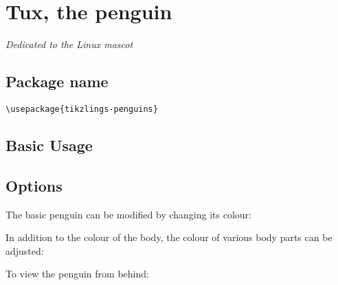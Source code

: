 \documentclass[parskip=half]{scrartcl}
\begin{document}
\section[Penguin]{Tux, the penguin}

\emph{Dedicated to the Linux mascot}

\subsection{Package name}

\begin{tcolorbox}[lower separated=false, lefthand width=.8\linewidth]
\vspace*{0.5cm}
\lstinline|\usepackage{tikzlings-penguins}| 
\vspace*{0.5cm}
\end{tcolorbox}

\subsection{Basic Usage}

\begin{tcblisting}{}
\penguin
\end{tcblisting}

\subsection{Options}

The basic penguin can be modified by changing its colour:
\begin{tcblisting}{}
\penguin[body=blue]
\end{tcblisting}

In addition to the colour of the body, the colour of various body parts can be adjusted:
\begin{tcblisting}{}
\penguin[eye=red]
\end{tcblisting}
\begin{tcblisting}{}
\penguin[pupil=red]
\end{tcblisting}
\begin{tcblisting}{}
\penguin[bill=red]
\end{tcblisting}
\begin{tcblisting}{}
\penguin[belly=red]
\end{tcblisting}
\begin{tcblisting}{}
\penguin[feet=red]
\end{tcblisting}

To view the penguin from behind:
\begin{tcblisting}{}
\penguin[back]
\end{tcblisting}
\end{document}
